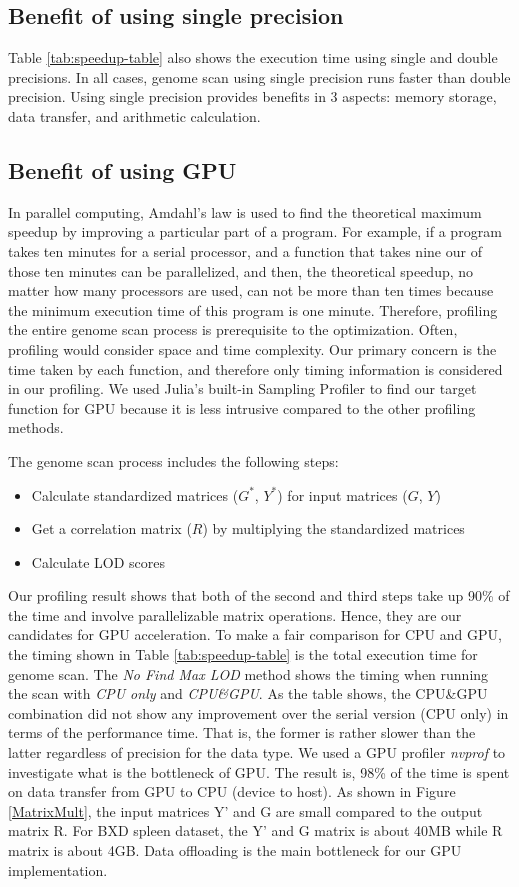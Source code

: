 \documentclass[9pt,twocolumn,twoside,lineno]{gsag3jnl}
\begin{document}
\subsection{Benefit of using single precision}
Table \ref{tab:speedup-table} also shows the execution time using single and double precisions. 
In all cases, genome scan using single precision runs faster than double precision. 
Using single precision provides benefits in 3 aspects: memory storage, data transfer, and arithmetic calculation. 

\subsection{Benefit of using GPU}
In parallel computing, Amdahl's law is used to find the theoretical maximum speedup by improving a particular part of a program.  
For example, if a program takes ten minutes for a serial processor, and a function that takes nine our of those ten minutes can be parallelized, and then, the theoretical speedup, no matter how many processors are used, can not be more than ten times because the minimum execution time of this program is one minute. 
Therefore, profiling the entire genome scan process is prerequisite to the optimization. 
Often, profiling would consider space and time complexity. 
Our primary concern is the time taken by each function, and therefore only timing information is considered in our profiling. 
We used Julia's built-in Sampling Profiler to find our target function for GPU because it is less intrusive compared to the other profiling methods. 

The genome scan process includes the following steps:
\begin{itemize}
	\item Calculate standardized matrices ($G^{\ast}$, $Y^{\ast}$) for input matrices ($G$, $Y$)
	\item Get a correlation matrix ($R$) by multiplying the standardized matrices
	\item Calculate LOD scores 
\end{itemize}
Our profiling result shows that both of the second and third steps take up 90\% of the time and involve parallelizable matrix operations.  Hence, they are our candidates for GPU acceleration.
To make a fair comparison for CPU and GPU, the timing shown in Table \ref{tab:speedup-table} is the total execution time for genome scan. 
The \textit{No Find Max LOD} method shows the timing when running the scan with \textit{CPU only} and \textit{CPU\&GPU}.
As the table shows, the CPU\&GPU combination did not show any improvement over the serial version (CPU only) in terms of the performance time.  That is, the former is rather slower than the latter regardless of precision for the data type.
We used a GPU profiler \textit{nvprof} \cite{nvprof}
to investigate what is the bottleneck of GPU. 
The result is, 98\% of the time is spent on data transfer from GPU to CPU (device to host).
As shown in Figure \ref{MatrixMult}, the input matrices Y' and G are small compared to the output matrix R.
For BXD spleen dataset, the Y' and G matrix is about 40MB %
while R matrix is about 4GB. 
Data offloading is the main bottleneck for our GPU implementation. 
\end{document}
